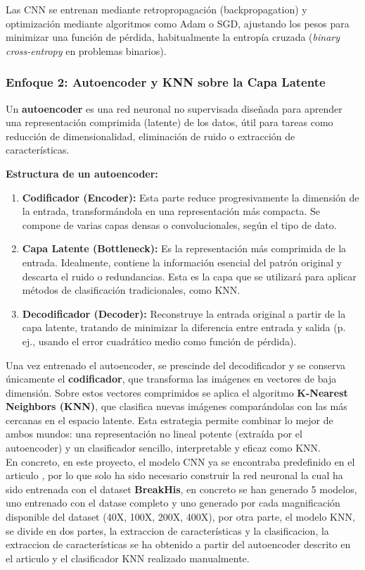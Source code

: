 \documentclass[12pt]{article} %
\begin{document}
Las CNN se entrenan mediante retropropagación (backpropagation) y optimización mediante algoritmos como Adam o SGD, ajustando los pesos para minimizar una función de pérdida, habitualmente la entropía cruzada (\textit{binary cross-entropy} en problemas binarios).

\subsubsection{Enfoque 2: Autoencoder y KNN sobre la Capa Latente}
Un \textbf{autoencoder} es una red neuronal no supervisada diseñada para aprender una representación comprimida (latente) de los datos, útil para tareas como reducción de dimensionalidad, eliminación de ruido o extracción de características.

\textbf{Estructura de un autoencoder:}
\begin{enumerate}
    \item \textbf{Codificador (Encoder):} Esta parte reduce progresivamente la dimensión de la entrada, transformándola en una representación más compacta. Se compone de varias capas densas o convolucionales, según el tipo de dato.
    \item \textbf{Capa Latente (Bottleneck):} Es la representación más comprimida de la entrada. Idealmente, contiene la información esencial del patrón original y descarta el ruido o redundancias. Esta es la capa que se utilizará para aplicar métodos de clasificación tradicionales, como KNN.
    \item \textbf{Decodificador (Decoder):} Reconstruye la entrada original a partir de la capa latente, tratando de minimizar la diferencia entre entrada y salida (p. ej., usando el error cuadrático medio como función de pérdida).
\end{enumerate}

Una vez entrenado el autoencoder, se prescinde del decodificador y se conserva únicamente el \textbf{codificador}, que transforma las imágenes en vectores de baja dimensión. Sobre estos vectores comprimidos se aplica el algoritmo \textbf{K-Nearest Neighbors (KNN)}, que clasifica nuevas imágenes comparándolas con las más cercanas en el espacio latente. Esta estrategia permite combinar lo mejor de ambos mundos: una representación no lineal potente (extraída por el autoencoder) y un clasificador sencillo, interpretable y eficaz como KNN.\\

En concreto, en este proyecto, el modelo CNN ya se encontraba predefinido en el articulo \cite{bardou2018classification}, por lo que solo ha sido necesario construir la red neuronal la cual ha sido entrenada con el dataset \textbf{BreakHis}, en concreto se han generado 5 modelos, uno entrenado con el datase completo y uno generado por cada magnificación disponible del dataset (40X, 100X, 200X, 400X), por otra parte, el modelo KNN, se divide en dos partes, la extraccion de características y la clasificacion, la extraccion de características se ha obtenido a partir del autoencoder descrito en el articulo \cite{minarno2021cnn} y el clasificador KNN realizado manualmente.
\end{document}
